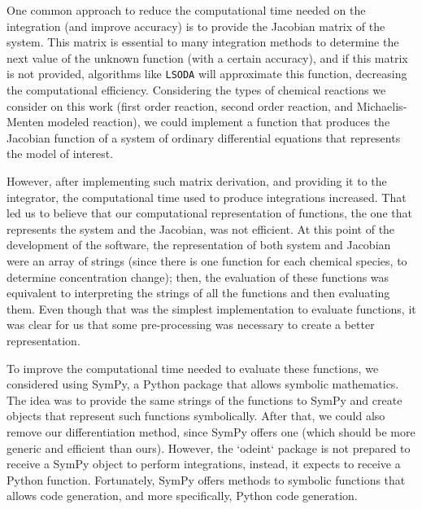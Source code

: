 One common approach to reduce the computational time needed on the
integration (and improve accuracy) is to provide the Jacobian matrix of
the system. This matrix is essential to many integration methods to
determine the next value of the unknown function (with a certain
accuracy), and if this matrix is not provided, algorithms like 
{\tt LSODA} will approximate this function, decreasing the computational 
efficiency. Considering the types of chemical reactions we consider on
this work (first order reaction, second order reaction, and
Michaelis-Menten modeled reaction), we could implement a function that 
produces the Jacobian function of a system of ordinary differential 
equations that represents the model of interest.

However, after implementing such matrix derivation, and providing it to
the integrator, the computational time used to produce integrations
increased. That led us to believe that our computational representation 
of functions, the one that represents the system and the Jacobian, was
not efficient. At this point of the development of the software, the
representation of both system and Jacobian were an array of strings
(since there is one function for each chemical species, to determine
concentration change); then, the evaluation of these functions was
equivalent to interpreting the strings of all the functions and then
evaluating them. Even though that was the simplest implementation to
evaluate functions, it was clear for us that some pre-processing was
necessary to create a better representation.

To improve the computational time needed to evaluate these functions, we
considered using SymPy, a Python package that allows symbolic
mathematics. The idea was to provide the same strings of the functions
to SymPy and create objects that represent such functions symbolically. 
After that, we could also remove our differentiation method, since SymPy
offers one (which should be more generic and efficient than ours). 
However, the `odeint` package is not prepared to receive a SymPy object 
to perform integrations, instead, it expects to receive a Python 
function. Fortunately, SymPy offers methods to symbolic functions that 
allows code generation, and more specifically, Python code generation.

